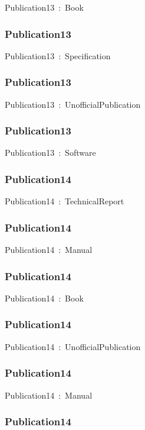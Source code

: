 \documentclass{article}
\begin{document}
Publication13~:~Book

\subsubsection*{Publication13}

Publication13~:~Specification

\subsubsection*{Publication13}

Publication13~:~UnofficialPublication

\subsubsection*{Publication13}

Publication13~:~Software

\subsubsection*{Publication14}

Publication14~:~TechnicalReport

\subsubsection*{Publication14}

Publication14~:~Manual

\subsubsection*{Publication14}

Publication14~:~Book

\subsubsection*{Publication14}

Publication14~:~UnofficialPublication

\subsubsection*{Publication14}

Publication14~:~Manual

\subsubsection*{Publication14}
\end{document}
